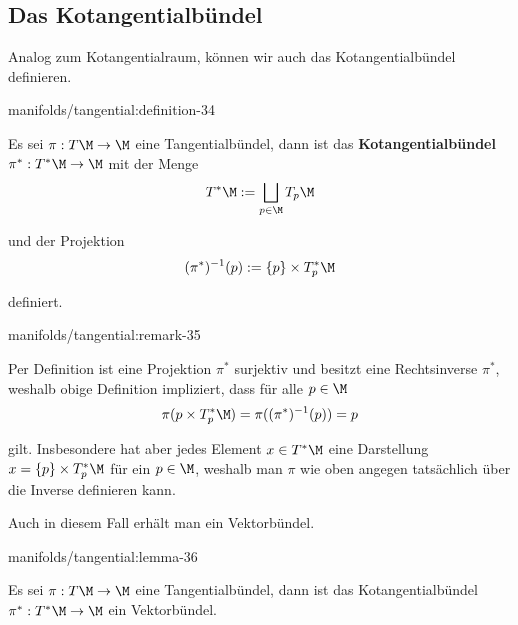 \documentclass[letterpaper,10pt,german]{jupyterBook}
\begin{document}
\subsection{Das Kotangentialbündel}
\label{\detokenize{manifolds/tangential:das-kotangentialbundel}}\label{\detokenize{manifolds/tangential:s-kotangbundel}}
\par
Analog zum Kotangentialraum, können wir auch das Kotangentialbündel definieren.
\begin{definition}{}{manifolds/tangential:definition-34}



\par
Es sei \(\pi:T\M\to\M\) eine Tangentialbündel, dann ist das \textbf{Kotangentialbündel} \(\pi^\ast: T^\ast\M\to\M\) mit der Menge
\begin{align*}
T^\ast\M := \bigsqcup_{p\in\M} T_p\M
\end{align*}
\par
und der Projektion
\begin{align*}
(\pi^{\ast})^{-1}(p):= \{p\}\times T_p^\ast\M
\end{align*}
\par
definiert.
\end{definition}
\begin{remark}{}{manifolds/tangential:remark-35}



\par
Per Definition ist eine Projektion \(\pi^\ast\) surjektiv und besitzt eine Rechtsinverse \(\pi^\ast\), weshalb obige Definition impliziert, dass für alle \(p\in\M\)
\begin{align*}
\pi({p}\times T_p^\ast\M) = \pi((\pi^{\ast})^{-1}(p)) = p
\end{align*}
\par
gilt. Insbesondere hat aber jedes Element \(x\in T^\ast\M\) eine Darstellung \(x=\{p\}\times T_p^\ast\M\) für ein \(p\in\M\), weshalb man \(\pi\) wie oben angegen tatsächlich über die Inverse definieren kann.
\end{remark}

\par
Auch in diesem Fall erhält man ein Vektorbündel.
\begin{lemma}{}{manifolds/tangential:lemma-36}



\par
Es sei \(\pi:T\M\to\M\) eine Tangentialbündel, dann ist das Kotangentialbündel \(\pi^\ast:T^\ast\M\to\M\) ein Vektorbündel.
\end{lemma}
\end{document}
